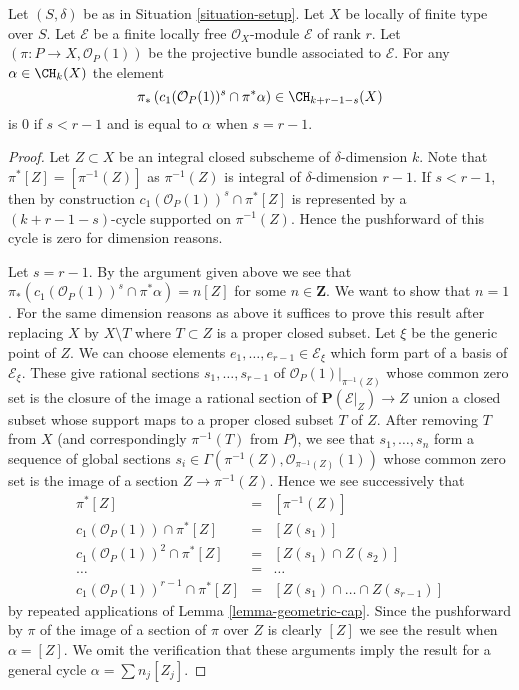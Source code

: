 \begin{lemma}
\label{lemma-cap-projective-bundle}
Let $(S, \delta)$ be as in Situation \ref{situation-setup}.
Let $X$ be locally of finite type over $S$.
Let $\mathcal{E}$ be a finite locally free $\mathcal{O}_X$-module
$\mathcal{E}$ of rank $r$. Let $(\pi : P \to X, \mathcal{O}_P(1))$
be the projective bundle associated to $\mathcal{E}$.
For any $\alpha \in \CH_k(X)$ the element
$$
\pi_*\left(
c_1(\mathcal{O}_P(1))^s \cap \pi^*\alpha
\right)
\in
\CH_{k + r - 1 - s}(X)
$$
is $0$ if $s < r - 1$ and is equal to $\alpha$ when $s = r - 1$.
\end{lemma}

\begin{proof}
Let $Z \subset X$ be an integral closed subscheme of $\delta$-dimension $k$.
Note that $\pi^*[Z] = [\pi^{-1}(Z)]$ as $\pi^{-1}(Z)$ is integral of
$\delta$-dimension $r - 1$.
If $s < r - 1$, then by construction
$c_1(\mathcal{O}_P(1))^s \cap \pi^*[Z]$
is represented by a $(k + r - 1 - s)$-cycle supported on
$\pi^{-1}(Z)$. Hence the pushforward of this cycle
is zero for dimension reasons.

\medskip\noindent
Let $s = r - 1$. By the argument given above we see that
$\pi_*(c_1(\mathcal{O}_P(1))^s \cap \pi^*\alpha) = n [Z]$
for some $n \in \mathbf{Z}$. We want to show that $n = 1$.
For the same dimension reasons
as above it suffices to prove this result after replacing $X$ by
$X \setminus T$ where $T \subset Z$ is a proper closed subset.
Let $\xi$ be the generic point of $Z$.
We can choose elements $e_1, \ldots, e_{r - 1} \in \mathcal{E}_\xi$
which form part of a basis of $\mathcal{E}_\xi$.
These give rational sections $s_1, \ldots, s_{r - 1}$
of $\mathcal{O}_P(1)|_{\pi^{-1}(Z)}$ whose common zero set
is the closure of the image a rational section of
$\mathbf{P}(\mathcal{E}|_Z) \to Z$ union a closed subset whose
support maps to a proper closed subset $T$ of $Z$.
After removing $T$ from $X$ (and correspondingly $\pi^{-1}(T)$
from $P$), we see that $s_1, \ldots, s_n$ form a sequence
of global sections
$s_i \in \Gamma(\pi^{-1}(Z), \mathcal{O}_{\pi^{-1}(Z)}(1))$
whose common zero set is the image of a section $Z \to \pi^{-1}(Z)$.
Hence we see successively that
\begin{eqnarray*}
\pi^*[Z] & = & [\pi^{-1}(Z)] \\
c_1(\mathcal{O}_P(1)) \cap \pi^*[Z] & = & [Z(s_1)] \\
c_1(\mathcal{O}_P(1))^2 \cap \pi^*[Z] & = & [Z(s_1) \cap Z(s_2)] \\
\ldots & = & \ldots \\
c_1(\mathcal{O}_P(1))^{r - 1} \cap \pi^*[Z] & = &
[Z(s_1) \cap \ldots \cap Z(s_{r - 1})]
\end{eqnarray*}
by repeated applications of Lemma \ref{lemma-geometric-cap}.
Since the pushforward by $\pi$ of the image of a
section of $\pi$ over $Z$ is clearly $[Z]$ we see the result
when $\alpha = [Z]$. We omit the verification that these
arguments imply the result for a general cycle $\alpha = \sum n_j [Z_j]$.
\end{proof}

